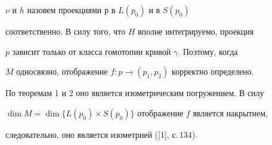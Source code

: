 $\nu$ и $h$ назовем проекциями $р$ в $L(p_0)$ и в $S(p_0)$ 


соответственно. В силу того, что $H$ вполне интегрируемо, проекция 


$p$ зависит только от класса гомотопии кривой $\gamma$. Поэтому, когда 


$M$ односвязно, отображение $f: p\to (p_1, p_2)$ корректно определено. 


По теоремам 1 и 2 оно является изометрическим погружением. В силу


$\dim M=\dim\{L(p_0)\times S(p_0)\}$ отображение $f$ является накрытием,


следовательно, оно является изометрией ([1], с.\,134).








